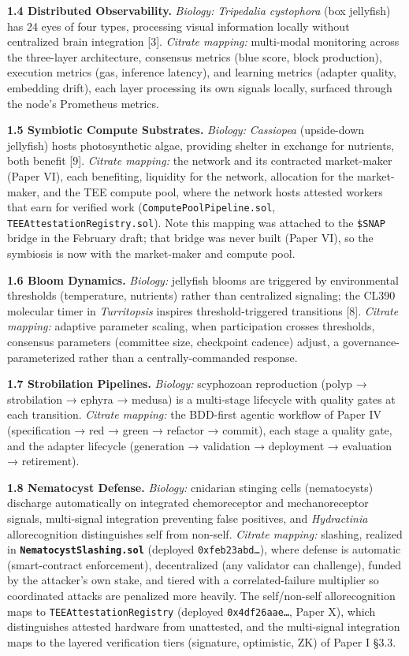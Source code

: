 \textbf{1.4 Distributed Observability.} \emph{Biology:} \emph{Tripedalia
cystophora} (box jellyfish) has 24 eyes of four types, processing visual
information locally without centralized brain integration {[}3{]}.
\emph{Citrate mapping:} multi-modal monitoring across the three-layer
architecture, consensus metrics (blue score, block production),
execution metrics (gas, inference latency), and learning metrics
(adapter quality, embedding drift), each layer processing its own
signals locally, surfaced through the node's Prometheus metrics.

\textbf{1.5 Symbiotic Compute Substrates.} \emph{Biology:}
\emph{Cassiopea} (upside-down jellyfish) hosts photosynthetic algae,
providing shelter in exchange for nutrients, both benefit {[}9{]}.
\emph{Citrate mapping:} the network and its contracted market-maker
(Paper VI), each benefiting, liquidity for the network, allocation for
the market-maker, and the TEE compute pool, where the network hosts
attested workers that earn for verified work
(\texttt{ComputePoolPipeline.sol}, \texttt{TEEAttestationRegistry.sol}).
Note this mapping was attached to the \texttt{\$SNAP} bridge in the
February draft; that bridge was never built (Paper VI), so the symbiosis
is now with the market-maker and compute pool.

\textbf{1.6 Bloom Dynamics.} \emph{Biology:} jellyfish blooms are
triggered by environmental thresholds (temperature, nutrients) rather
than centralized signaling; the CL390 molecular timer in
\emph{Turritopsis} inspires threshold-triggered transitions {[}8{]}.
\emph{Citrate mapping:} adaptive parameter scaling, when participation
crosses thresholds, consensus parameters (committee size, checkpoint
cadence) adjust, a governance-parameterized rather than a
centrally-commanded response.

\textbf{1.7 Strobilation Pipelines.} \emph{Biology:} scyphozoan
reproduction (polyp → strobilation → ephyra → medusa) is a multi-stage
lifecycle with quality gates at each transition. \emph{Citrate mapping:}
the BDD-first agentic workflow of Paper IV (specification → red → green
→ refactor → commit), each stage a quality gate, and the adapter
lifecycle (generation → validation → deployment → evaluation →
retirement).

\textbf{1.8 Nematocyst Defense.} \emph{Biology:} cnidarian stinging
cells (nematocysts) discharge automatically on integrated chemoreceptor
and mechanoreceptor signals, multi-signal integration preventing false
positives, and \emph{Hydractinia} allorecognition distinguishes self
from non-self. \emph{Citrate mapping:} slashing, realized in
\textbf{\texttt{NematocystSlashing.sol}} (deployed
\texttt{0xfeb23abd…}), where defense is automatic (smart-contract
enforcement), decentralized (any validator can challenge), funded by the
attacker's own stake, and tiered with a correlated-failure multiplier so
coordinated attacks are penalized more heavily. The self/non-self
allorecognition maps to \texttt{TEEAttestationRegistry} (deployed
\texttt{0x4df26aae…}, Paper X), which distinguishes attested hardware
from unattested, and the multi-signal integration maps to the layered
verification tiers (signature, optimistic, ZK) of Paper I §3.3.

